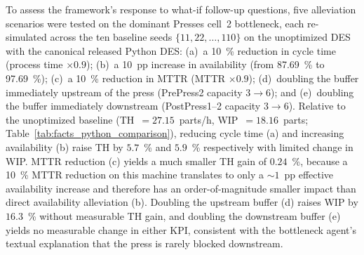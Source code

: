 \documentclass[a4paper,fleqn]{cas-sc}
\begin{document}
                                                                                                                                            
  To assess the framework's response to what-if follow-up questions, five                                                                   
  alleviation scenarios were tested on the dominant Presses cell~2                                                                          
  bottleneck, each re-simulated across the ten baseline seeds                                                                               
  $\{11, 22, \ldots, 110\}$ on the unoptimized DES with the canonical                                                                       
  released Python DES: (a)~a 10~\% reduction in cycle time (process time                                                                    
  $\times 0.9$); (b)~a 10~pp increase in availability (from 87.69~\% to                                                                     
  97.69~\%); (c)~a 10~\% reduction in MTTR (MTTR $\times 0.9$); (d)~doubling                                                                
  the buffer immediately upstream of the press (PrePress2 capacity                                                                          
  $3 \to 6$); and (e)~doubling the buffer immediately downstream                                                                            
  (PostPress1--2 capacity $3 \to 6$). Relative to the unoptimized baseline                                                                  
  (TH~$=27.15$~parts/h, WIP~$=18.16$~parts;                                                                                                 
  Table~\ref{tab:facts_python_comparison}), reducing cycle time (a) and                                                                     
  increasing availability (b) raise TH by $5.7$~\% and $5.9$~\% respectively                                                                
  with limited change in WIP. MTTR reduction (c) yields a much smaller                                                                      
  TH gain of $0.24$~\%, because a 10~\% MTTR reduction on this machine                                                                      
  translates to only a ${\sim}1$~pp effective availability increase and                                                                     
  therefore has an order-of-magnitude smaller impact than direct                                                                            
  availability alleviation (b). Doubling the upstream buffer (d) raises                                                                     
  WIP by $16.3$~\% without measurable TH gain, and doubling the downstream                                                                  
  buffer (e) yields no measurable change in either KPI, consistent with the                                                                 
  bottleneck agent's textual explanation that the press is rarely blocked                                                                   
  downstream. 
\end{document}
